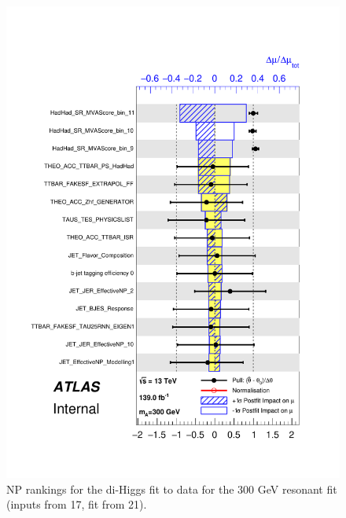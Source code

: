 \begin{figure}
\centering
\includegraphics[width=.8\textwidth]{figures/results/HH/HadHad/HadHadFit21062021/PullsAndRankings/pulls_SigXsecOverSM_300.pdf}
\caption{NP rankings for the di-Higgs \hadhad fit to data for the 300 GeV resonant fit (inputs from 17, fit from 21).}
\label{fig:HadHadPostfitNPRankings2HDM300}
\end{figure}

